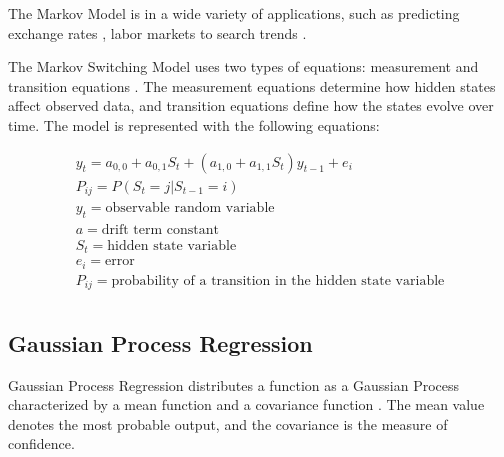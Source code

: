 The Markov Model is in a wide variety of applications,
such as predicting exchange rates \cite{engel_can_1994}, 
labor markets \cite{krolzig_a_2002} to search trends \cite{bergamaschi_a_2011}.

The Markov Switching Model uses two types of equations:
measurement and transition equations \cite{ansari_predicting_2015}.
The measurement equations determine how hidden states affect observed data,
and transition equations define how the states evolve over time.
The model is represented with the following equations:

\begin{align}
	y_t =a_{0,0} + a_{0,1} S_t + (a_{1,0}+a_{1,1} S_t) y_{t-1} +e_i \\
	P_{ij}=P(S_t=j | S_{t-1} = i) \\
	y_t = \mbox{observable random variable} \\
	a = \mbox{drift term constant} \\
	S_t = \mbox{hidden state variable} \\ 
	e_i = \mbox{error} \\
	P_{ij} = \mbox{probability of a transition in the hidden state variable} \\ 
	
\end{align}


\subsection{Gaussian Process Regression}
Gaussian Process Regression distributes a function as a Gaussian Process
characterized by a mean function and a covariance function \cite{melo_gaussian_2012}.
The mean value denotes the most probable output, and the covariance is the measure
of confidence. 



